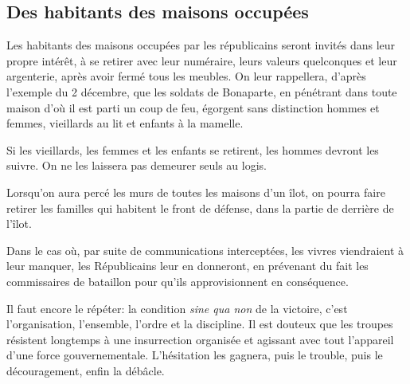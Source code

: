 \documentclass[french,twoside]{book} %
\newif\ifdev
\renewcommand{\LettrineFontHook}{\color{rubric}}
\newcommand{\initialiv}[2]{%
  \let\oldLFH\LettrineFontHook
  \IfSubStr{QJ’}{#1}{
    \lettrine[lines=4, lhang=0.2, loversize=-0.1, lraise=0.2]{\smash{#1}}{#2}
  }{\IfSubStr{É}{#1}{
    \lettrine[lines=4, lhang=0.2, loversize=-0, lraise=0]{\smash{#1}}{#2}
  }{\IfSubStr{ÀÂ}{#1}{
    \lettrine[lines=4, lhang=0.2, loversize=-0, lraise=0, slope=0.6em]{\smash{#1}}{#2}
  }{\IfSubStr{A}{#1}{
    \lettrine[lines=4, lhang=0.2, loversize=0.2, slope=0.6em]{\smash{#1}}{#2}
  }{\IfSubStr{V}{#1}{
    \lettrine[lines=4, lhang=0.2, loversize=0.2, slope=-0.5em]{\smash{#1}}{#2}
  }{
    \lettrine[lines=4, lhang=0.2, loversize=0.2]{\smash{#1}}{#2}
  }}}}}
  \let\LettrineFontHook\oldLFH
}
\renewcommand{\LettrineFontHook}{\bfseries\color{rubric}}
\begin{document}
\subsection[Des habitants des maisons occupées]{Des habitants des maisons occupées}
\noindent Les habitants des maisons occupées par les républicains seront invités dans leur propre intérêt, à se retirer avec leur numéraire, leurs valeurs quelconques et leur argenterie, après avoir fermé tous les meubles. On leur rappellera, d’après l’exemple du 2 décembre, que les soldats de Bonaparte, en pénétrant dans toute maison d’où il est parti un coup de feu, égorgent sans distinction hommes et femmes, vieillards au lit et enfants à la mamelle.\par
Si les vieillards, les femmes et les enfants se retirent, les hommes devront les suivre. On ne les laissera pas demeurer seuls au logis.\par
Lorsqu’on aura percé les murs de toutes les maisons d’un îlot, on pourra faire retirer les familles qui habitent le front de défense, dans la partie de derrière de l’îlot.\par
Dans le cas où, par suite de communications interceptées, les vivres viendraient à leur manquer, les Républicains leur en donneront, en prévenant du fait les commissaires de bataillon pour qu’ils approvisionnent en conséquence.\par
Il faut encore le répéter: la condition \emph{sine qua non} de la victoire, c’est l’organisation, l’ensemble, l’ordre et la discipline. Il est douteux que les troupes résistent longtemps à une insurrection organisée et agissant avec tout l’appareil d’une force gouvernementale. L'hésitation les gagnera, puis le trouble, puis le découragement, enfin la débâcle.
 


\ifbooklet
  \newpage\null\thispagestyle{empty}\newpage
\fi

\ifdev %
\fontname\font — \textsc{Les règles du jeu}\par
(\hyperref[utopie]{\underline{Lien}})\par
\noindent \initialiv{A}{lors là}\blindtext\par
\noindent \initialiv{À}{ la bonheur des dames}\blindtext\par
\noindent \initialiv{É}{tonnez-le}\blindtext\par
\noindent \initialiv{Q}{ualitativement}\blindtext\par
\noindent \initialiv{V}{aloriser}\blindtext\par
\Blindtext
\phantomsection
\label{utopie}
\Blinddocument
\fi
\end{document}
